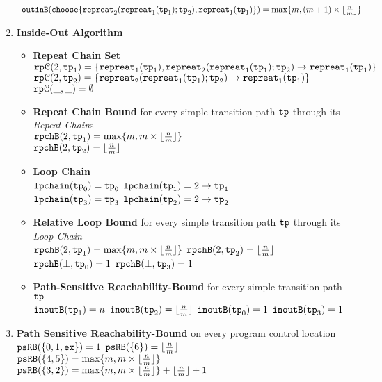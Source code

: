 \begin{enumerate}
\[\begin{array}{l}
        \\
        \outinB(\rpchoose{\rprepeat_2(\rprepeat_1(\tpath_1); \tpath_2), \rprepeat_1(\tpath_1) })
        = \max\{m, (m  + 1)\times \lfloor\frac{n}{m}\rfloor\}
\end{array}
\]
\item \textbf{Inside-Out Algorithm}
\begin{itemize}
  \item \textbf{Repeat Chain Set}
  \\
  $\mathtt{rp}\mathcal{C}(2, \mathtt{tp}_1) = \{\mathtt{repreat}_1(\mathtt{tp}_1), \mathtt{repreat}_2(\mathtt{repreat}_1(\mathtt{tp}_1); \mathtt{tp}_2) \to \mathtt{repreat}_1(\mathtt{tp}_1)\}$ \\
  $\mathtt{rp}\mathcal{C}(2, \mathtt{tp}_2) = \{\mathtt{repreat}_2(\mathtt{repreat}_1(\mathtt{tp}_1); \mathtt{tp}_2) \to \mathtt{repreat}_1(\mathtt{tp}_1)\}$ \\
  $\mathtt{rp}\mathcal{C}(\_, \_) = \emptyset$ 
  \item \textbf{Repeat Chain Bound} for every simple transition path $\mathtt{tp}$ through its \emph{Repeat Chain}s
  \\
  $\mathtt{rpchB}(2, \mathtt{tp}_1) = \max\{m, m \times \lfloor\frac{n}{m}\rfloor\}$ \\
  $\mathtt{rpchB}(2, \mathtt{tp}_2) = \lfloor\frac{n}{m}\rfloor$ 
  \item \textbf{Loop Chain}
  \\
  $\mathtt{lpchain}(\mathtt{tp}_0) = \mathtt{tp}_0$ \qquad
  $\mathtt{lpchain}(\mathtt{tp}_1) = 2\to \mathtt{tp}_1$ \\
  $\mathtt{lpchain}(\mathtt{tp}_3) = \mathtt{tp}_3$ \qquad
  $\mathtt{lpchain}(\mathtt{tp}_2) = 2\to \mathtt{tp}_2$ 
  \item \textbf{{Relative Loop Bound}} for every simple transition path $\mathtt{tp}$ through its \emph{Loop Chain}
  \\
  $\mathtt{rpchB}(2, \mathtt{tp}_1) = \max\{m, m \times \lfloor\frac{n}{m}\rfloor\}$ \quad
  $\mathtt{rpchB}(2, \mathtt{tp}_2) = \lfloor\frac{n}{m}\rfloor$  \\
  $\mathtt{rpchB}(\bot, \mathtt{tp}_0) = 1$ \quad
  $\mathtt{rpchB}(\bot, \mathtt{tp}_3) = 1$ 
  \item \textbf{Path-Sensitive Reachability-Bound} for every simple transition path $\mathtt{tp}$
  \\
  $\mathtt{inoutB}(\mathtt{tp}_1) = n$ \quad
  $\mathtt{inoutB}(\mathtt{tp}_2) = \lfloor\frac{n}{m}\rfloor$ \quad
  $\mathtt{inoutB}(\mathtt{tp}_0) = 1$ \quad
  $\mathtt{inoutB}(\mathtt{tp}_3) = 1$ 
\end{itemize}
\item \textbf{Path Sensitive Reachability-Bound} on every program control location
\\
$\mathtt{psRB}(\{0, 1, \mathtt{ex}\}) = 1$ \qquad
$\mathtt{psRB}(\{6 \}) = \lfloor\frac{n}{m}\rfloor$ \\
$\mathtt{psRB}(\{4, 5 \}) = \max\{m, m \times \lfloor\frac{n}{m}\rfloor\}$ \quad
$\mathtt{psRB}(\{3, 2 \}) = \max\{m, m \times \lfloor\frac{n}{m}\rfloor\} + \lfloor\frac{n}{m}\rfloor + 1 $ \\
\end{enumerate}